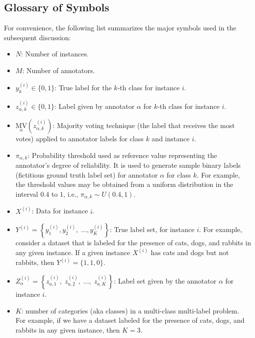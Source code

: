 \subsection{Glossary of Symbols}
For convenience, the following list summarizes the major symbols used in the subsequent discussion:
\begin{itemize}[itemsep=1em]
\renewcommand{\textbullet}{}
    \item  $N$: Number of instances.
    \item  $M$: Number of annotators.
    \item  $y_k^{(i)} \in \{0,1\} $: True label for the $k $-th class for instance $i $.
    \item  $z_{\alpha,k}^{(i)} \in \{0,1\} $: Label given by annotator $\alpha $ for $k $-th class for instance $i $.
    \item  ${{\underset\alpha{\mathrm{MV}}}{\left(z_{\alpha,k}^{(i)}\right)}} $: Majority voting technique (the label that receives the most votes) applied to annotator labels for class $k $ and instance $i $.
    \item  $\pi_{\alpha,k} $: Probability threshold used as reference value representing the annotator's degree of reliability. It is used to generate sample binary labels (fictitious ground truth label set) for annotator $\alpha $ for class $k $. For example, the threshold values may be obtained from a uniform distribution in the interval $0.4 $ to $1 $, i.e., $\pi_{\alpha,k} \sim U(0.4,1) $.

    \item  $X^{(i)} $: Data for instance $i$.

    \item  $Y^{(i)}=\left\{y_1^{(i)},y_2^{(i)},\;\dots,y_{K}^{(i)}\right\} $: True label set, for instance $i $. For example, consider a dataset that is labeled for the presence of cats, dogs, and rabbits in any given instance. If a given instance $X^{(i)} $ has cats and dogs but not rabbits, then $Y^{(i)}=\{1,1,0\} $.

    \item  $Z_{\alpha}^{(i)}=\left\{z_{a,1}^{(i)},\;z_{a,2}^{(i)},\;\dots,\;z_{a,K}^{(i)}\right\} $: Label set given by the annotator $\alpha $ for instance $i $.

    \item $K$: number of categories (aka classes) in a multi-class multi-label problem. For example, if we have a dataset labeled for the presence of cats, dogs, and rabbits in any given instance, then $K=3$.


\end{itemize}
